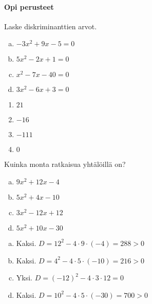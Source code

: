 \begin{tehtavasivu}

\paragraph*{Opi perusteet}

\begin{tehtava}
	Laske diskriminanttien arvot.
	\begin{enumerate}[a)]
		\item $-3x^2+9x-5=0$
		\item $5x^2-2x+1=0$
		\item $x^2-7x-40=0$
		\item $3x^2-6x+3=0$
	\end{enumerate}
	\begin{vastaus}
		\begin{enumerate}
			\item $21$
			\item $-16$
			\item $-111$
			\item $0$
		\end{enumerate}
	\end{vastaus}
\end{tehtava}


\begin{tehtava}
	Kuinka monta ratkaisua yhtälöillä on?
	\begin{enumerate}[a)]
		\item $9x^2+12x-4$
		\item $5x^2+4x-10$
		\item $3x^2-12x+12$
		\item $5x^2+10x-30$
	\end{enumerate}
	\begin{vastaus}
		\begin{enumerate}[a)]
			\item Kaksi. $D=12^2-4 \cdot 9 \cdot (-4) = 288 >0$
			\item Kaksi. $D=4^2-4\cdot 5 \cdot (-10) = 216 >0$
			\item Yksi. $D=(-12)^2-4\cdot 3\cdot 12 =0$
			\item Kaksi. $D=10^2-4\cdot 5 \cdot (-30) = 700 >0$
		\end{enumerate}
	\end{vastaus}
\end{tehtava}


\end{tehtavasivu}
